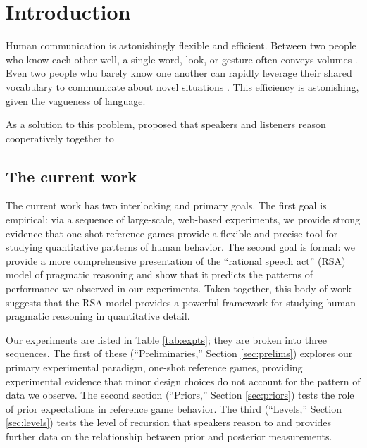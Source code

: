 \section{Introduction}

Human communication is astonishingly flexible and efficient. Between two people who know each other well, a single word, look, or gesture often conveys volumes \cite{grice1975,sperber1986,clark1996}. Even two people who barely know one another can rapidly leverage their shared vocabulary to communicate about novel situations \cite{brennan1993}.  This efficiency is astonishing, given the vagueness of language. 

As a solution to this problem,  proposed that speakers and listeners reason cooperatively together to 


\subsection{The current work}

The current work has two interlocking and primary goals. The first goal is empirical: via a sequence of large-scale, web-based experiments, we provide strong evidence that one-shot reference games provide a flexible and precise tool for studying quantitative patterns of human behavior. The second goal is formal: we provide a more comprehensive presentation of the ``rational speech act'' (RSA) model of pragmatic reasoning and show that it predicts the patterns of performance we observed in our experiments. Taken together, this body of work suggests that the RSA model provides a powerful framework for studying human pragmatic reasoning in quantitative detail. 

Our experiments are listed in Table \ref{tab:expts}; they are broken into three sequences. The first of these (``Preliminaries,'' Section \ref{sec:prelims}) explores our primary experimental paradigm, one-shot reference games, providing experimental evidence that minor design choices do not account for the pattern of data we observe. The second section (``Priors,'' Section \ref{sec:priors}) tests the role of prior expectations in reference game behavior. The third (``Levels,'' Section \ref{sec:levels}) tests the level of recursion that speakers reason to and provides further data on the relationship between prior and posterior measurements. 


